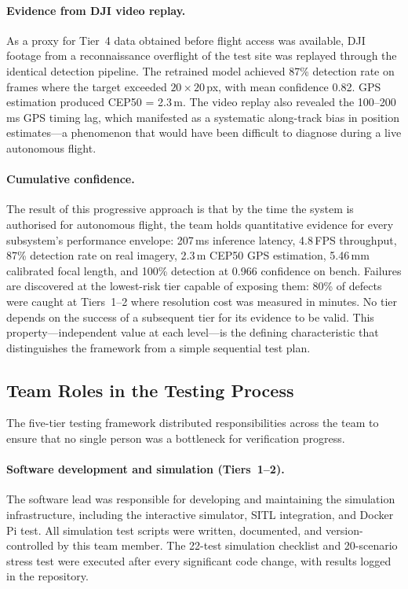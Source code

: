 \paragraph{Evidence from DJI video replay.}
As a proxy for Tier~4 data obtained before flight access was available, DJI footage from a reconnaissance overflight of the test site was replayed through the identical detection pipeline.  The retrained model achieved 87\% detection rate on frames where the target exceeded $20 \times 20$\,px, with mean confidence 0.82.  GPS estimation produced CEP50 = 2.3\,m.  The video replay also revealed the 100--200\,ms GPS timing lag, which manifested as a systematic along-track bias in position estimates---a phenomenon that would have been difficult to diagnose during a live autonomous flight.

\paragraph{Cumulative confidence.}
The result of this progressive approach is that by the time the system is authorised for autonomous flight, the team holds quantitative evidence for every subsystem's performance envelope: 207\,ms inference latency, 4.8\,FPS throughput, 87\% detection rate on real imagery, 2.3\,m CEP50 GPS estimation, 5.46\,mm calibrated focal length, and 100\% detection at 0.966 confidence on bench.  Failures are discovered at the lowest-risk tier capable of exposing them: 80\% of defects were caught at Tiers~1--2 where resolution cost was measured in minutes.  No tier depends on the success of a subsequent tier for its evidence to be valid.  This property---independent value at each level---is the defining characteristic that distinguishes the framework from a simple sequential test plan.

\subsection{Team Roles in the Testing Process}\label{sec:team-testing-roles}

The five-tier testing framework distributed responsibilities across the team to ensure that no single person was a bottleneck for verification progress.

\paragraph{Software development and simulation (Tiers~1--2).}
The software lead was responsible for developing and maintaining the simulation infrastructure, including the interactive simulator, SITL integration, and Docker Pi test.  All simulation test scripts were written, documented, and version-controlled by this team member.  The 22-test simulation checklist and 20-scenario stress test were executed after every significant code change, with results logged in the repository.

